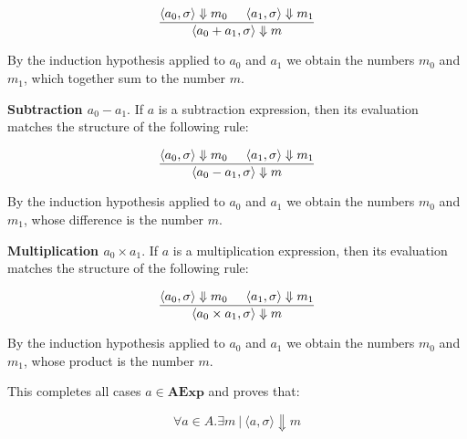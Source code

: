 \documentclass{article}
\begin{document}
  $$
  \frac{\langle a_0, \sigma \rangle \Downarrow m_0 \hspace{5mm} \langle a_1, \sigma \rangle \Downarrow m_1}{\langle a_0 + a_1, \sigma \rangle \Downarrow m}
  $$

  \noindent By the induction hypothesis applied to $a_0$ and $a_1$ we obtain the numbers $m_0$ and $m_1$, which together sum to the number $m$.

  \medskip
  \noindent \textbf{Subtraction $a_0 - a_1$}. If $a$ is a subtraction expression, then its evaluation matches the structure of the following rule:

  $$
  \frac{\langle a_0, \sigma \rangle \Downarrow m_0 \hspace{5mm} \langle a_1, \sigma \rangle \Downarrow m_1}{\langle a_0 - a_1, \sigma \rangle \Downarrow m}
  $$

  \noindent By the induction hypothesis applied to $a_0$ and $a_1$ we obtain the numbers $m_0$ and $m_1$, whose difference is the number $m$.

  \medskip
  \noindent \textbf{Multiplication $a_0 \times a_1$}. If $a$ is a multiplication expression, then its evaluation matches the structure of the following rule:

  $$
  \frac{\langle a_0, \sigma \rangle \Downarrow m_0 \hspace{5mm} \langle a_1, \sigma \rangle \Downarrow m_1}{\langle a_0 \times a_1, \sigma \rangle \Downarrow m}
  $$

  \noindent By the induction hypothesis applied to $a_0$ and $a_1$ we obtain the numbers $m_0$ and $m_1$, whose product is the number $m$.
  
  This completes all cases $a \in \textbf{AExp}$ and proves that:

  $$
  \forall a \in A. \exists m~|~\langle a, \sigma \rangle \Downarrow m
  $$
\end{document}
